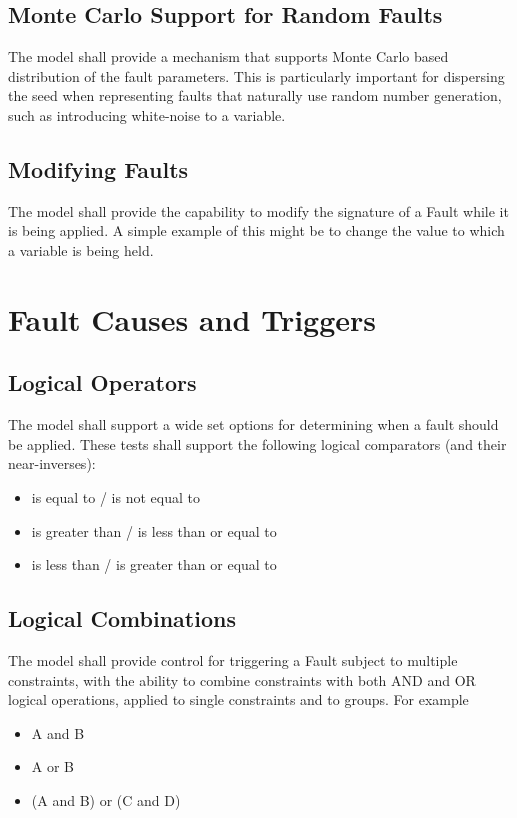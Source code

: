 \documentclass[11pt,fleqn]{report}
\begin{document}
\subsection{Monte Carlo Support for Random Faults}
The model shall provide a mechanism that supports Monte Carlo based distribution
of the fault parameters. This is particularly important for dispersing the seed
when representing faults that naturally use random number generation, such as
introducing white-noise to a variable.

\subsection{Modifying Faults}
The model shall provide the capability to modify the signature of a Fault while
it is being applied. A simple example of this might be to change the value to
which a variable is being held.

\section{ Fault Causes and Triggers}
\subsection{Logical Operators}
The model shall support a wide set options for determining when a fault should
be applied. These tests shall support the following logical comparators (and
their near-inverses):
\begin{itemize}
 \item is equal to / is not equal to
 \item is greater than / is less than or equal to
 \item is less than / is greater than or equal to
\end{itemize}

\subsection{Logical Combinations}
The model shall provide control for triggering a Fault subject to multiple
constraints, with the ability to combine constraints with both AND and OR
logical operations, applied to single constraints and to groups. For example
\begin{itemize}
 \item A and B
 \item A or B
 \item (A and B) or (C and D)
\end{itemize}
\end{document}
